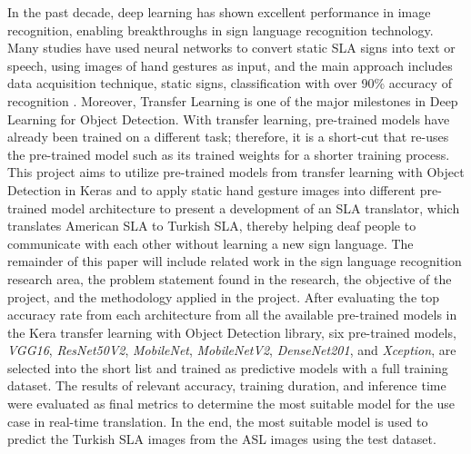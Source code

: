 In the past decade, deep learning has shown excellent performance in image recognition, enabling breakthroughs in sign language recognition technology. Many studies have used neural networks to convert static SLA signs into text or speech, using images of hand gestures as input, and the main approach includes data acquisition technique, static signs, classification with over 90\% accuracy of recognition \cite{wadhawan2021sign}. Moreover, Transfer Learning is one of the major milestones in Deep Learning for Object Detection. With transfer learning, pre-trained models have already been trained on a different task; therefore, it is a short-cut that re-uses the pre-trained model such as its trained weights for a shorter training process. This project aims to utilize pre-trained models from transfer learning with Object Detection in Keras and to apply static hand gesture images into different pre-trained model architecture to present a development of an SLA translator, which translates American SLA to Turkish SLA, thereby helping deaf people to communicate with each other without learning a new sign language. The remainder of this paper will include related work in the sign language recognition research area, the problem statement found in the research, the objective of the project, and the methodology applied in the project. After evaluating the top accuracy rate from each architecture from all the available pre-trained models in the Kera transfer learning with Object Detection library, six pre-trained models, \textit{VGG16}, \textit{ResNet50V2}, \textit{MobileNet}, \textit{MobileNetV2}, \textit{DenseNet201}, and \textit{Xception}, are selected into the short list and trained as predictive models with a full training dataset. The results of relevant accuracy, training duration, and inference time were evaluated as final metrics to determine the most suitable model for the use case in real-time translation. In the end, the most suitable model is used to predict the Turkish SLA images from the ASL images using the test dataset.